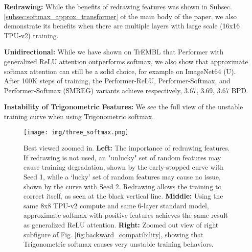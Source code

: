\textbf{Redrawing:} While the benefits of redrawing features was shown in Subsec. \ref{subsec:softmax_approx_transformer} of the main body of the paper, we also demonstrate its benefits when there are multiple layers with large scale (16x16 TPU-v2) training.

\textbf{Unidirectional:} While we have shown on TrEMBL that Performer with generalized ReLU attention outperforms softmax, we also show that approximate softmax attention can still be a solid choice, for example on ImageNet64 (U). After 100K steps of training, the Performer-ReLU, Performer-Softmax, and Performer-Softmax (SMREG) variants achieve respectively, 3.67, 3.69, 3.67 BPD.

\textbf{Instability of Trigonometric Features:} We see the full view of the unstable training curve when using Trigonometric softmax.

\vspace{2mm}

\begin{figure}[h]
  \centering
  \texttt{[image: img/three\_softmax.png]}
  \caption{Best viewed zoomed in. \textbf{Left:} The importance of redrawing features. If redrawing is not used, an "unlucky" set of random features may cause training degradation, shown by the early-stopped curve with Seed 1, while a `lucky' set of random features may cause no issue, shown by the curve with Seed 2. Redrawing allows the training to correct itself, as seen at the black vertical line. \textbf{Middle:} Using the same 8x8 TPU-v2 compute and same 6-layer standard model, approximate softmax with positive features achieves the same result as generalized ReLU attention. \textbf{Right:} Zoomed out view of right subfigure of Fig. \ref{fig:backward_compatibility}, showing that Trigonometric softmax causes very unstable training behaviors.
  }
  \label{fig:appendix_redraw}
  \label{fig:im64_relu_softmax}
  \label{fig:pg19_full_softmax}
\end{figure}



